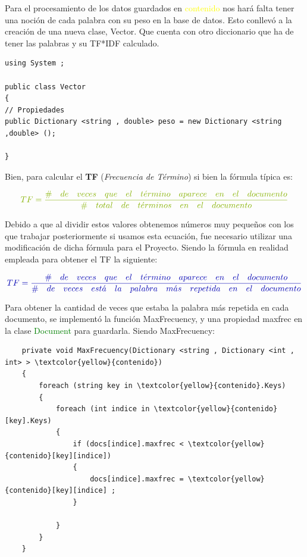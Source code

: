 \documentclass{article}
\begin{document}
Para el procesamiento de los datos guardados en \textcolor{yellow!80!black}{\textcolor{yellow}{contenido}} nos hará falta tener una noción de cada palabra con su peso en la base de datos. Esto conllevó a la creación de una nueva clase, \textcolor{pink!90!black}{Vector}. Que cuenta con otro diccionario que ha de tener las palabras y su TF*IDF calculado.
\begin{lstlisting}
using System ; 

public class Vector
{
// Propiedades
public Dictionary <string , double> peso = new Dictionary <string ,double> ();

}
\end{lstlisting}

Bien, para calcular el \textbf{TF} (\emph{Frecuencia de Término}) si bien la fórmula típica es:

\begin{equation} \label{eq:TF}
\textcolor{lime!70!black}{TF  =  \frac{{\#\quad de\quad veces\quad que\quad el\quad t\acute{e}rmino\quad aparece\quad en\quad el\quad documento}}{{\#\quad total\quad de\quad t\acute{e}rminos\quad en\quad el\quad documento}}}
\end{equation}

Debido a que al dividir estos valores obtenemos números muy pequeños con los que trabajar posteriormente si usamos esta ecuación, fue necesario utilizar una modificación de dicha fórmula para el Proyecto.
Siendo la fórmula en realidad empleada para obtener el TF la siguiente:

\begin{equation} \label{eq:TF}
\textcolor{blue!70!black}{TF  =  \frac{{\#\quad de\quad veces\quad que\quad el\quad t\acute{e}rmino\quad aparece\quad en\quad el\quad documento}}{{\#\quad de\quad veces\quad est\acute{a}\quad la\quad palabra\quad m\acute{a}s\quad repetida\quad en\quad el\quad documento}}}
\end{equation}

Para obtener la cantidad de veces que estaba la palabra más repetida en cada documento, se implementó la función MaxFrecuency, y una propiedad maxfrec en la clase \textcolor{green}{Document} para guardarla. Siendo MaxFrecuency:
\begin{lstlisting}
    private void MaxFrecuency(Dictionary <string , Dictionary <int , int> > \textcolor{yellow}{contenido})
    {
        foreach (string key in \textcolor{yellow}{contenido}.Keys)
        {
            foreach (int indice in \textcolor{yellow}{contenido}[key].Keys)
            {
                if (docs[indice].maxfrec < \textcolor{yellow}{contenido}[key][indice])
                {
                    docs[indice].maxfrec = \textcolor{yellow}{contenido}[key][indice] ;
                }

            }
        }     
    }
\end{lstlisting}
\end{document}
